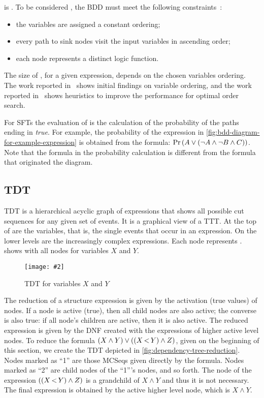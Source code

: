 \documentclass[12pt,openright,twoside,a4paper,oldfontcommands,english,brazil,draft]{abntex2}
\theoremstyle{theo}
\newcommand{\includegraphicsaspectratio}[2][1]{%
  \texttt{[image: \#2]}%
}
\newcommand{\parsin}[1]{\ensuremath\left( #1 \right)}
\def\pand{\ensuremath\operatorname{<}}
\def\probabilityop{\ensuremath \Pr}
\newcommand{\probability}[1]{\ensuremath \probabilityop\parsin{#1}}
\begin{document}
 is .
To be considered , the \ac{BDD} must meet the following constraints~\cite{BRB1990}:
%
\begin{itemize}
  \item the variables are assigned a constant ordering;
  \item every path to sink nodes visit the input variables in ascending order;
  \item each node represents a distinct logic function.
\end{itemize}
%
The size of , for a given expression, depends on the chosen variables ordering.
The work reported in~\cite{Rudell1993} shows initial findings on variable ordering, and the work reported in~\cite{KH2014} shows heuristics to improve the performance for optimal order search.

For \acp{SFT} the evaluation of  is the calculation of the probability of the paths ending in \emph{true}.
For example, the probability of the expression in \cref{fig:bdd-diagram-for-example-expression} is obtained from the formula: $\probability{A \lor \parsin{\lnot A \land \lnot B \land C}}$. Note that the formula in the probability calculation is different from the formula that originated the diagram.

\subsection{\Acl{TDT}}
\label{sec:dependency-trees}

\Acf{TDT} is a hierarchical acyclic graph of expressions that shows all possible cut sequences for any given set of events.
It is a graphical view of a \ac{TTT}.
At the top of  are the variables, that is, the single events that occur in an expression.
On the lower levels are the increasingly complex expressions.
Each node represents .
 shows  with all nodes for variables $X$ and $Y$.

\begin{figure}
  \centering
  \includegraphicsaspectratio[0.5]{simple-dependency-tree}
  \caption{\acs*{TDT} for variables $X$ and $Y$}
  \label{fig:simple-dependency-tree}
\end{figure}

The reduction of a structure expression is given by the activation (true values) of nodes.
If a node is active (true), then all child nodes are also active; the converse is also true: if all node's children are active, then it is also active.
The reduced expression is given by the \ac{DNF} created with the expressions of higher active level nodes.
To reduce the formula $\parsin{X \land Y} \lor \parsin{\parsin{X \pand Y} \land Z}$, given on the beginning of this section, we create the \ac{TDT} depicted in \cref{fig:dependency-tree-reduction}.
Nodes marked as ``1'' are those \acp{MCSeq} given directly by the formula.
Nodes marked as ``2'' are child nodes of the ``1'''s nodes, and so forth.
The node of the expression $\parsin{\parsin{X \pand Y} \land Z}$ is a grandchild of $X \land Y$ and thus it is not necessary.
The final expression is obtained by the active higher level node, which is $X \land Y$.
\end{document}
